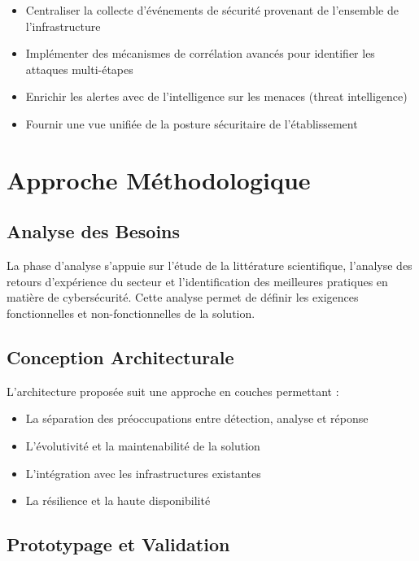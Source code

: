 \begin{itemize}
    \item Centraliser la collecte d'événements de sécurité provenant de l'ensemble de l'infrastructure
    \item Implémenter des mécanismes de corrélation avancés pour identifier les attaques multi-étapes
    \item Enrichir les alertes avec de l'intelligence sur les menaces (threat intelligence)
    \item Fournir une vue unifiée de la posture sécuritaire de l'établissement
\end{itemize}



\section{Approche Méthodologique}

\subsection{Analyse des Besoins}

La phase d'analyse s'appuie sur l'étude de la littérature scientifique, l'analyse des retours d'expérience du secteur et l'identification des meilleures pratiques en matière de cybersécurité. Cette analyse permet de définir les exigences fonctionnelles et non-fonctionnelles de la solution.

\subsection{Conception Architecturale}

L'architecture proposée suit une approche en couches permettant :
\begin{itemize}
    \item La séparation des préoccupations entre détection, analyse et réponse
    \item L'évolutivité et la maintenabilité de la solution
    \item L'intégration avec les infrastructures existantes
    \item La résilience et la haute disponibilité
\end{itemize}

\subsection{Prototypage et Validation}

